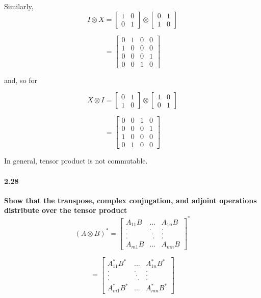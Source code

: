 Similarly,
$$ I \otimes X  = \begin{bmatrix}
    1 & 0 \\ 0 & 1
\end{bmatrix} \otimes \begin{bmatrix}
    0 & 1 \\ 1 & 0
\end{bmatrix}$$

$$ = \begin{bmatrix}
    0 & 1 & 0 & 0 \\
    1 & 0 & 0 & 0 \\
    0 & 0 & 0 & 1 \\
    0 & 0 & 1 & 0
\end{bmatrix}$$

and, so for

$$ X \otimes I  = \begin{bmatrix}
    0 & 1 \\ 1 & 0
\end{bmatrix} \otimes \begin{bmatrix}
    1 & 0 \\ 0 & 1
\end{bmatrix}$$

$$ = \begin{bmatrix}
    0 & 0 & 1 & 0 \\
    0 & 0 & 0 & 1 \\
    1 & 0 & 0 & 0 \\
    0 & 1 & 0 & 0
\end{bmatrix}$$

In general, tensor product is not commutable.

\paragraph{2.28} \textbf{Show that the transpose, complex conjugation, and adjoint operations
distribute over the tensor product} %
\\
$$ (A \otimes B)^* = \begin{bmatrix}
    A_{11}B & ... & A_{1n}B \\
    . & . & . \\
    . & \ . & . \\
    . & \ \ . & . \\
    A_{m1}B & ... & A_{m n}B
\end{bmatrix}^*$$

$$ = \begin{bmatrix}
    A_{11}^*B^* & ... & A_{1n}^*B^* \\
    . & . & . \\
    . & \ . & . \\
    . & \ \ . & . \\
    A_{m1}^*B^* & ... & A_{m n}^*B^*
\end{bmatrix} $$

